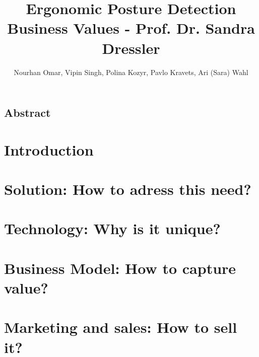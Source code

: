 \documentclass[a4paper, 11pt]{report}
\title{
    {\Huge Ergonomic Posture Detection}\\
    {\large Business Values - Prof. Dr. Sandra Dressler}
}
\author{Nourhan Omar, Vipin Singh, Polina Kozyr, Pavlo Kravets, Ari (Sara) Wahl}
\date{
    \begin{figure}[h]
        \texttt{[image: test]}
    \end{figure}
}
\begin{document}
    

	{
		\FloatBarrier
		\newpage
        \setcounter{page}{2}
		\thispagestyle{plain}
		\vspace*{\fill}
			\section*{{\Large Abstract}}
			
		\vspace*{\fill}
	}

    {
        \FloatBarrier
        \newpage
        \tableofcontents
    }

	{
		\FloatBarrier
		\chapter{Introduction}
		\label{chp:introduction}
		
	}

	{
		\FloatBarrier
		\chapter{Solution: How to adress this need?}
		\label{chp:solution}
		
	}

	{
		\FloatBarrier
		\chapter{Technology: Why is it unique?}
		\label{chp:technology}
		
	}

	{
		\FloatBarrier
		\chapter{Business Model: How to capture value?}
		\label{chp:business_model}
		
	}

	{
		\FloatBarrier
		\chapter{Marketing and sales: How to sell it?}
		\label{chp:marketing}
		
	}
\end{document}
